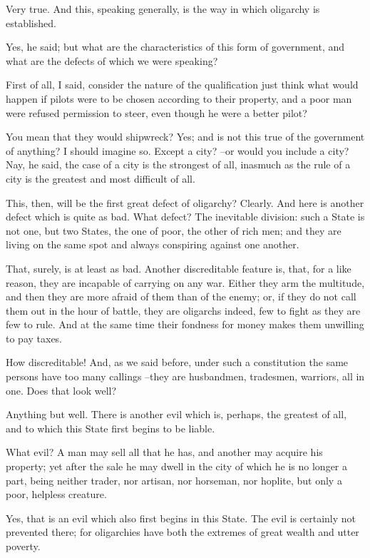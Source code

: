 Very true.
And this, speaking generally, is the way in which oligarchy is established.

Yes, he said; but what are the characteristics of this form of government, and what are the defects of which we were speaking?

First of all, I said, consider the nature of the qualification just think what would happen if pilots were to be chosen according to their property, and a poor man were refused permission to steer, even though he were a better pilot?

You mean that they would shipwreck?
Yes; and is not this true of the government of anything?
I should imagine so.
Except a city? --or would you include a city?
Nay, he said, the case of a city is the strongest of all, inasmuch as the rule of a city is the greatest and most difficult of all.

This, then, will be the first great defect of oligarchy?
Clearly.
And here is another defect which is quite as bad.
What defect?
The inevitable division: such a State is not one, but two States, the one of poor, the other of rich men; and they are living on the same spot and always conspiring against one another.

That, surely, is at least as bad.
Another discreditable feature is, that, for a like reason, they are incapable of carrying on any war. Either they arm the multitude, and then they are more afraid of them than of the enemy; or, if they do not call them out in the hour of battle, they are oligarchs indeed, few to fight as they are few to rule. And at the same time their fondness for money makes them unwilling to pay taxes.

How discreditable!
And, as we said before, under such a constitution the same persons have too many callings --they are husbandmen, tradesmen, warriors, all in one. Does that look well?

Anything but well.
There is another evil which is, perhaps, the greatest of all, and to which this State first begins to be liable.

What evil?
A man may sell all that he has, and another may acquire his property; yet after the sale he may dwell in the city of which he is no longer a part, being neither trader, nor artisan, nor horseman, nor hoplite, but only a poor, helpless creature.

Yes, that is an evil which also first begins in this State.
The evil is certainly not prevented there; for oligarchies have both the extremes of great wealth and utter poverty.

